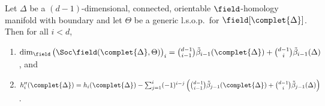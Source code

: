 \begin{theorem} \label{soc-and-h''}
Let $\Delta$ be a $(d-1)$-dimensional, connected, orientable $\field$-homology manifold with boundary and let $\Theta$ be a generic l.s.o.p.~for $\field[\complet{\Delta}]$. Then for all $i<d$,
\begin{enumerate}
\item\label{theo4.1_1} $\dim_\field \big(\Soc \field(\complet{\Delta},\Theta)\big)_i=\binom{d-1}{i-1}\tilde{\beta}_{i-1}(\complet{\Delta})+\binom{d-1}{i}\tilde{\beta}_{i-1}(\Delta)$, and
\item\label{theo4.1_2} $h''_i(\complet{\Delta})=h_i(\complet{\Delta})-\sum_{j=1}^{i}(-1)^{i-j}\left(\binom{d-1}{i-1}\tilde{\beta}_{j-1}(\complet{\Delta})+\binom{d-1}{i}\tilde{\beta}_{j-1}(\Delta)\right)$.
\end{enumerate}
\end{theorem}
